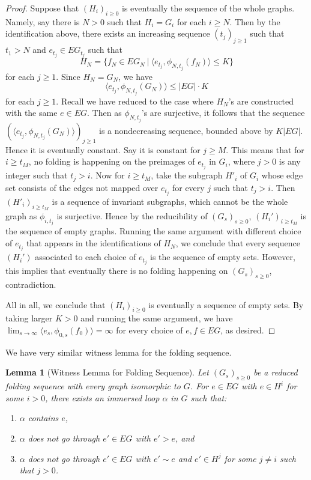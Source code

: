 \documentclass[11pt, letterpaper]{amsart}
\theoremstyle{plain}
\newtheorem{lemma}[theorem]{Lemma}
\theoremstyle{definition}
\begin{document}
\begin{proof}
  Suppose that $(H_i)_{i \ge 0}$ is eventually the sequence of the whole graphs.
  Namely, say there is $N>0$ such that $H_i = G_i$ for each $i \ge N$. Then
  by the identification above, there exists an increasing sequence $(t_j)_{j \ge
    1}$ such that $t_1 > N$ and $e_{t_j} \in EG_{t_j}$ such that
  \[
    H_N = \{f_N \in EG_N\ |\ \langle e_{t_j}, \phi_{N, t_j}(f_N)  \rangle \le K\}
  \]
  for each $j \ge 1$. Since $H_N = G_N$, we have
  \[
    \langle e_{t_j}, \phi_{N, t_j}(G_N) \rangle \le |EG| \cdot K
  \]
  for each $j \ge 1$. Recall we have reduced to the case where $H_N$'s are
  constructed with the same $e \in EG$. 
  Then as $\phi_{N,t_j}$'s are
  surjective, it follows that the sequence $(\langle e_{t_j}, \phi_{N,t_j}(G_N)
  \rangle)_{j \ge 1}$ is a nondecreasing sequence, bounded above by $K|EG|$.
  Hence it is eventually constant. Say it is constant for $j \ge M$.
  This means that for $i \ge t_M$, no folding is happening on the preimages of
  $e_{t_j}$ in $G_i$, where $j>0$ is any integer such that $t_j>i$. Now for $i \ge t_M$, take the subgraph $H'_i$
  of $G_i$ whose edge set consists of the edges not mapped over $e_{t_j}$ for
  every $j$ such that $t_j > i$. Then $(H'_i)_{i \ge t_M}$ is a sequence of
  invariant subgraphs, which cannot be the whole graph as $\phi_{i, t_j}$ is
  surjective. Hence by the reducibility of $(G_s)_{s \ge 0}$, $(H_i')_{i \ge
    t_M}$ is the sequence of empty graphs. Running the same argument with
  different choice of $e_{t_j}$ that appears in the identifications of $H_N$, we
  conclude that every sequence $(H_i')$ associated to each choice of $e_{t_j}$
  is the sequence of empty sets. However, this implies that eventually there is no
  folding happening on $(G_s)_{s \ge 0}$, contradiction.

  All in all, we conclude that $(H_i)_{i \ge 0}$ is eventually a sequence of
  empty sets. By taking larger $K >0$ and running the same argument, we have
  $\lim_{s \to \infty}\langle e_s, \phi_{0,s}(f_0) \rangle = \infty$ for every
  choice of $e,f \in EG$, as desired.
\end{proof}

  
We have very similar witness lemma for the folding sequence. 
\begin{lemma}[Witness Lemma for Folding Sequence]\label{lem:witness-folding}
  Let $(G_s)_{s \ge 0}$ be a reduced folding sequence with every graph isomorphic to
  $G$. For $e \in EG$ with $e \in H^i$ for some $i > 0$, there exists an immersed loop
  $\alpha$ in $G$ such that:
  \begin{enumerate}[label=(\arabic*)]
  \item $\alpha$ contains $e$,
  \item $\alpha$ does not go through $e' \in EG$ with
    $e' > e$, and
  \item $\alpha$ does not go through $e' \in EG$ with $e' \sim e$ and $e' \in
    H^j$ for some $j\neq i$ such that $j>0$.
  \end{enumerate}
\end{lemma}
\end{document}
